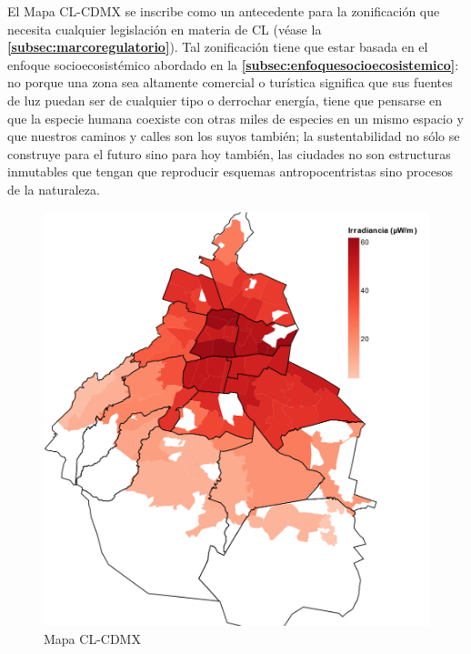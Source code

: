 El Mapa CL-CDMX se inscribe como un antecedente para la zonificación que necesita cualquier legislación en materia de CL (véase la \textbf{\autoref{subsec:marcoregulatorio}}). Tal zonificación tiene que estar basada en el enfoque socioecosistémico abordado en la \textbf{\autoref{subsec:enfoquesocioecosistemico}}: no porque una zona sea altamente comercial o turística significa que sus fuentes de luz puedan ser de cualquier tipo o derrochar energía, tiene que pensarse en que la especie humana coexiste con otras miles de especies en un mismo espacio y que nuestros caminos y calles son los suyos también; la sustentabilidad no sólo se construye para el futuro sino para hoy también, las ciudades no son estructuras inmutables que tengan que reproducir esquemas antropocentristas sino procesos de la naturaleza. 

\newpage

\vspace{100mm} 

\begin{figure}[H]
  \centering
    \includegraphics[width=1\textwidth]{MapaCLCDMX}
  \caption{Mapa CL-CDMX} 
  \label{MapaCLDMX}
\end{figure}

\newpage